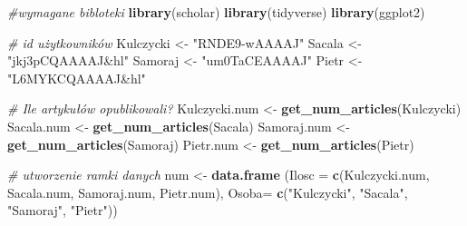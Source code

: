 \documentclass[
  12pt,
]{article}
\newenvironment{Shaded}{\begin{snugshade}}{\end{snugshade}}
\newcommand{\AttributeTok}[1]{\textcolor[rgb]{0.13,0.29,0.53}{#1}}
\newcommand{\CommentTok}[1]{\textcolor[rgb]{0.56,0.35,0.01}{\textit{#1}}}
\newcommand{\FunctionTok}[1]{\textcolor[rgb]{0.13,0.29,0.53}{\textbf{#1}}}
\newcommand{\NormalTok}[1]{#1}
\newcommand{\OtherTok}[1]{\textcolor[rgb]{0.56,0.35,0.01}{#1}}
\newcommand{\StringTok}[1]{\textcolor[rgb]{0.31,0.60,0.02}{#1}}
\begin{document}
\begin{Shaded}
\begin{Highlighting}[]
\CommentTok{\#wymagane bibloteki}
\FunctionTok{library}\NormalTok{(scholar)}
\FunctionTok{library}\NormalTok{(tidyverse)}
\FunctionTok{library}\NormalTok{(ggplot2)}

\CommentTok{\# id  użytkowników}
\NormalTok{Kulczycki }\OtherTok{\textless{}{-}} \StringTok{"RNDE9{-}wAAAAJ"}  
\NormalTok{Sacala }\OtherTok{\textless{}{-}} \StringTok{"jkj3pCQAAAAJ\&hl"} 
\NormalTok{Samoraj }\OtherTok{\textless{}{-}} \StringTok{"um0TaCEAAAAJ"} 
\NormalTok{Pietr }\OtherTok{\textless{}{-}} \StringTok{"L6MYKCQAAAAJ\&hl"} 

\CommentTok{\# Ile artykułów opublikowali?}
\NormalTok{Kulczycki.num }\OtherTok{\textless{}{-}} \FunctionTok{get\_num\_articles}\NormalTok{(Kulczycki)}
\NormalTok{Sacala.num }\OtherTok{\textless{}{-}} \FunctionTok{get\_num\_articles}\NormalTok{(Sacala)}
\NormalTok{Samoraj.num }\OtherTok{\textless{}{-}} \FunctionTok{get\_num\_articles}\NormalTok{(Samoraj)}
\NormalTok{Pietr.num }\OtherTok{\textless{}{-}} \FunctionTok{get\_num\_articles}\NormalTok{(Pietr)}

\CommentTok{\# utworzenie ramki danych}
\NormalTok{num }\OtherTok{\textless{}{-}} \FunctionTok{data.frame}\NormalTok{ (}\AttributeTok{Ilosc =} \FunctionTok{c}\NormalTok{(Kulczycki.num, }
\NormalTok{                              Sacala.num, }
\NormalTok{                              Samoraj.num, }
\NormalTok{                              Pietr.num),}
                  \AttributeTok{Osoba=} \FunctionTok{c}\NormalTok{(}\StringTok{"Kulczycki"}\NormalTok{, }\StringTok{"Sacala"}\NormalTok{, }\StringTok{"Samoraj"}\NormalTok{, }\StringTok{"Pietr"}\NormalTok{))}


\end{Highlighting}
\end{Shaded}
\end{document}
